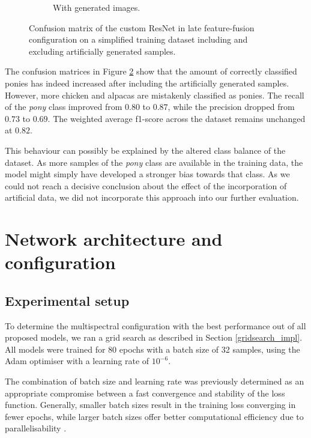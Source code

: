 \documentclass{l4proj}
\begin{document}
\begin{figure}[ht]
\begin{subfigure}[h!]{0.3\textwidth}
    \caption{With generated images.}
    \label{fig:auto_confusion_auto}
  \end{subfigure}
  \caption{Confusion matrix of the custom ResNet in late feature-fusion configuration on a simplified training dataset including and excluding artificially generated samples.}
  \label{fig:auto_confusion}
\end{figure}

The confusion matrices in Figure \ref{fig:auto_confusion} show that the amount of correctly classified ponies has indeed increased after including the artificially generated samples. However, more chicken and alpacas are mistakenly classified as ponies. The recall of the \textit{pony} class improved from $0.80$ to $0.87$, while the precision dropped from $0.73$ to $0.69$. The weighted average f1-score across the dataset remains unchanged at $0.82$. 

This behaviour can possibly be explained by the altered class balance of the dataset. As more samples of the \textit{pony} class are available in the training data, the model might simply have developed a stronger bias towards that class. As we could not reach a decisive conclusion about the effect of the incorporation of artificial data, we did not incorporate this approach into our further evaluation.


\section{Network architecture and configuration}
\label{eval_arch}

\subsection{Experimental setup}

To determine the multispectral configuration with the best performance out of all proposed models, we ran a grid search as described in Section \ref{gridsearch_impl}. All models were trained for 80 epochs with a batch size of 32 samples, using the Adam optimiser with a learning rate of $10^{-6}$. 

The combination of batch size and learning rate was previously determined as an appropriate compromise between a fast convergence and stability of the loss function. Generally, smaller batch sizes result in the training loss converging in fewer epochs, while larger batch sizes offer better computational efficiency due to parallelisability \citep{devarakonda_adabatch_2018}. 
\end{document}
